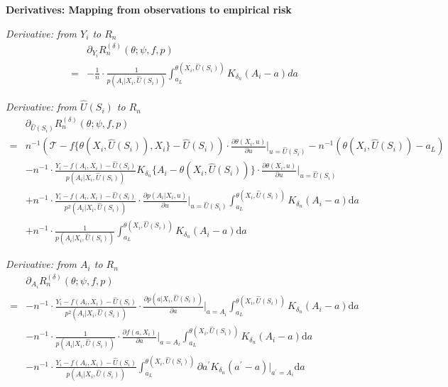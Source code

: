 \documentclass[12pt]{article}
\begin{document}
\noindent \textbf{Derivatives: Mapping from observations to empirical risk}

\noindent \textit{Derivative: from $Y_i$ to $R_n$}
\begin{align}
    &\partial_{Y_i}R_n^{(\delta)}(\theta;\psi,f,p)\nonumber\\
    =& -\frac{1}{n}\cdot\frac{1}{p(A_i|X_i,\widehat U(S_i))}\int_{a_L}^{\theta(X_i,\widehat U(S_i))}K_{\delta_n}(A_i-a)da\label{eq:derivative_R_n_Y}
\end{align}

\noindent \textit{Derivative: from $\widehat U(S_i)$ to $R_n$}
\begin{align}
&\partial_{\widehat U(S_i)}R_n^{(\delta)}(\theta;\psi,f,p)\nonumber\\
    = & n^{-1}(\mathcal{T}-f\{\theta(X_i,\widehat U(S_i)),X_i\}-\widehat U(S_i))\cdot \frac{\partial \theta(X_i,u)}{\partial u}\bigg|_{u = \widehat U(S_i)} -n^{-1}(\theta(X_i,\widehat U(S_i)) - a_L) \label{eq:derivative_R_n_hat_U_1}\\
    & - n^{-1}\cdot\frac{Y_i - f(A_i,X_i)-\widehat U(S_i)}{p(A_i|X_i,\widehat U(S_i))}K_{\delta_n}\{A_i-\theta(X_i,\widehat U(S_i))\}\cdot \frac{\partial \theta(X_i,u)}{\partial u}\bigg|_{u = \widehat U(S_i)} \label{eq:derivative_R_n_hat_U_2}\\
    & + n^{-1}\cdot\frac{Y_i - f(A_i,X_i)-\widehat U(S_i)}{p^2(A_i|X_i,\widehat U(S_i))}\cdot \frac{\partial p(A_i|X_i,u)}{\partial u}\bigg|_{u = \widehat U(S_i)} \int_{a_L}^{\theta(X_i,\widehat U(S_i))} K_{\delta_n}(A_i-a)\mathrm{d}a \label{eq:derivative_R_n_hat_U_3}\\
    & + n^{-1}\cdot\frac{1}{p(A_i|X_i,\widehat U(S_i))} \int_{a_L}^{\theta(X_i,\widehat U(S_i))} K_{\delta_n}(A_i-a)\mathrm{d}a \label{eq:derivative_R_n_hat_U_4}
\end{align}

\noindent \textit{Derivative: from $A_i$ to $R_n$}
\begin{align}
&\partial_{A_i}R_n^{(\delta)}(\theta;\psi,f,p)\nonumber\\
= & -n^{-1}\cdot\frac{Y_i - f(A_i,X_i)-\widehat U(S_i)}{p^2(A_i|X_i,\widehat U(S_i))}\cdot \frac{\partial p(a|X_i,\widehat U(S_i))}{\partial a}\bigg|_{a = A_i}\int_{a_L}^{\theta(X_i,\widehat U(S_i))} K_{\delta_n}(A_i-a)\mathrm{d}a  \label{eq:derivative_R_n_A_1}\\
& - n^{-1}\cdot\frac{1}{p(A_i|X_i,\widehat U(S_i))}\cdot \frac{\partial f(a,X_i)}{\partial a}\bigg|_{a = A_i}\int_{a_L}^{\theta(X_i,\widehat U(S_i))} K_{\delta_n}(A_i-a)\mathrm{d}a \label{eq:derivative_R_n_A_2} \\
    & -n^{-1}\cdot\frac{Y_i - f(A_i,X_i)-\widehat U(S_i)}{p(A_i|X_i,\widehat U(S_i))}\int_{a_L}^{\theta(X_i,\widehat U(S_i))} \partial a^\prime K_{\delta_n}(a^\prime-a)|_{a^\prime=A_i}\mathrm{d}a \label{eq:derivative_R_n_A_3}
\end{align}
\end{document}
